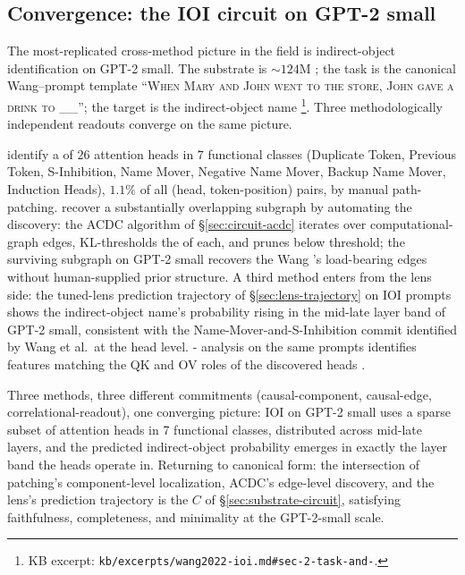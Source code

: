 \subsection{Convergence: the IOI circuit on GPT-2 small}
\label{sec:cross-ioi}

The most-replicated cross-method picture in the field is
indirect-object identification on GPT-2 small. The substrate is
$\sim 124$M ; the task is the canonical Wang--prompt
template ``\textsc{When Mary and John went to the store, John gave a
drink to \_\_}''; the target is the indirect-object name
\citep{wang2022-ioi}\footnote{KB excerpt:
\texttt{kb/excerpts/wang2022-ioi.md\#sec-2-task-and-}.}. Three
methodologically independent readouts converge on the same 
picture.

\citet{wang2022-ioi} identify a  of $26$ attention heads in
$7$ functional classes (Duplicate Token, Previous Token,
S-Inhibition, Name Mover, Negative Name Mover, Backup Name Mover,
Induction Heads), $1.1\%$ of all (head, token-position) pairs, by
manual path-patching. \citet{conmy2023-acdc} recover a substantially
overlapping subgraph by automating the discovery: the ACDC
algorithm of \S\ref{sec:circuit-acdc} iterates over
computational-graph edges, KL-thresholds the  of
each, and prunes below threshold; the surviving subgraph on GPT-2
small recovers the Wang 's load-bearing edges without
human-supplied prior structure. A third method enters from the
lens side: the tuned-lens prediction trajectory of
\S\ref{sec:lens-trajectory} on IOI prompts shows the
indirect-object name's probability rising in the mid-late layer
band of GPT-2 small, consistent with the Name-Mover-and-S-Inhibition
commit identified by Wang et al.\ at the head level. -
analysis on the same prompts identifies features matching the QK
and OV roles of the discovered heads
.

\begin{intuition}
Three methods, three different commitments (causal-component,
causal-edge, correlational-readout), one converging picture: IOI on
GPT-2 small uses a sparse subset of attention heads in 7 functional
classes, distributed across mid-late layers, and the predicted
indirect-object probability emerges in exactly the layer band the
heads operate in. Returning to canonical form: the intersection of
patching's component-level localization, ACDC's edge-level discovery,
and the lens's prediction trajectory is the 
$C$ of \S\ref{sec:substrate-circuit}, satisfying faithfulness,
completeness, and minimality at the GPT-2-small scale.
\end{intuition}

